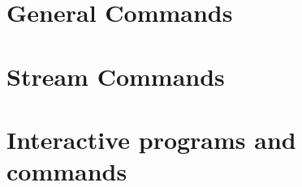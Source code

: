\section{General Commands}

%
%
%
%

\section{Stream Commands}

%
%
%
%
%
%


\section{Interactive programs and commands}






